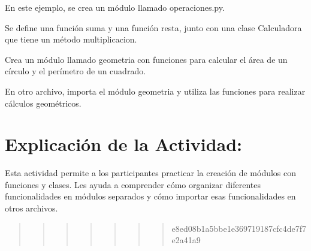 \documentclass[
  a4paper,
  DIV=11,
  numbers=noendperiod,
  onepage,
  openany]{scrreprt}
\begin{document}
En este ejemplo, se crea un módulo llamado operaciones.py.

Se define una función suma y una función resta, junto con una clase
Calculadora que tiene un método multiplicacion.

\begin{tcolorbox}[enhanced jigsaw, colbacktitle=quarto-callout-important-color!10!white, toprule=.15mm, leftrule=.75mm, titlerule=0mm, opacityback=0, rightrule=.15mm, opacitybacktitle=0.6, breakable, left=2mm, coltitle=black, title=\textcolor{quarto-callout-important-color}{\faExclamation}\hspace{0.5em}{Actividad Práctica:}, toptitle=1mm, bottomtitle=1mm, arc=.35mm, bottomrule=.15mm, colback=white, colframe=quarto-callout-important-color-frame]

Crea un módulo llamado geometria con funciones para calcular el área de
un círculo y el perímetro de un cuadrado.

En otro archivo, importa el módulo geometria y utiliza las funciones
para realizar cálculos geométricos.

\end{tcolorbox}

\hypertarget{explicaciuxf3n-de-la-actividad-59}{%
\section{Explicación de la
Actividad:}\label{explicaciuxf3n-de-la-actividad-59}}

Esta actividad permite a los participantes practicar la creación de
módulos con funciones y clases. Les ayuda a comprender cómo organizar
diferentes funcionalidades en módulos separados y cómo importar esas
funcionalidades en otros archivos.

\begin{quote}
\begin{quote}
\begin{quote}
\begin{quote}
\begin{quote}
\begin{quote}
\begin{quote}
e8ed08b1a5bbe1e369719187cfc4de7f7e2a41a9
\end{quote}
\end{quote}
\end{quote}
\end{quote}
\end{quote}
\end{quote}
\end{quote}
\end{document}
